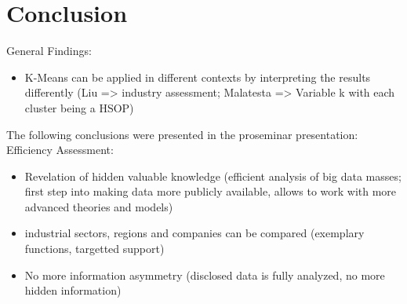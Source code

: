 \chapter{Conclusion}
\label{cha:conclusion}






General Findings:
\begin{itemize}
    \item K-Means can be applied in different contexts by interpreting the results differently (Liu => industry assessment; Malatesta => Variable k with each cluster being a HSOP)
\end{itemize}

The following conclusions were presented in the proseminar presentation:
Efficiency Assessment:
\begin{itemize}
    \item Revelation of hidden valuable knowledge (efficient analysis of big data masses; first step into making data more publicly available, allows to work with more advanced theories and models)
    \item industrial sectors, regions and companies can be compared (exemplary functions, targetted support)
    \item No more information asymmetry (disclosed data is fully analyzed, no more hidden information)
\end{itemize}

